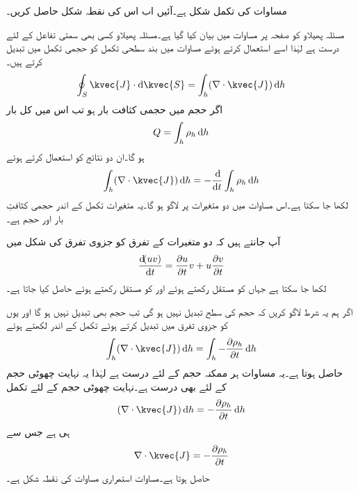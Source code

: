 مساوات   کی تکمل شکل ہے۔آئیں اب اس کی نقطہ شکل حاصل کریں۔

مسئلہ پھیلاو کو صفحہ  پر مساوات  میں بیان کیا گیا ہے۔مسئلہ پھیلاو کسی بھی سمتی تفاعل کے لئے درست ہے لہٰذا اسے استعمال کرتے ہوئے مساوات  میں بند سطحی تکمل کو حجمی تکمل میں تبدیل کرتے ہیں۔
\begin{align*}
\oint_S \kvec{J} \cdot \dif \kvec{S}=\int_h (\nabla \cdot \kvec{J}) \dif h
\end{align*}
اگر حجم میں حجمی کثافت بار  ہو تب اس میں کل بار
\begin{align*}
Q=\int_h \rho_h \dif h
\end{align*}
ہو گا۔ان دو نتائج کو استعمال کرتے ہوئے
\begin{align*}
\int_h (\nabla \cdot \kvec{J}) \dif h=-\frac{\dif}{\dif t} \int_h \rho_h \dif h
\end{align*}
لکھا جا سکتا ہے۔اس مساوات میں  دو متغیرات پر لاگو ہو گا۔یہ متغیرات تکمل کے اندر حجمی کثافتِ بار  اور حجم  ہے۔

آپ جانتے ہیں کہ دو متغیرات کے تفرق کو جزوی تفرق کی شکل میں
\begin{align*}
\frac{\dif (uv)}{\dif t}=\frac{\partial u}{\partial t} v+ u  \frac{\partial v}{\partial t}
\end{align*}
لکھا جا سکتا ہے جہاں  کو مستقل رکھتے ہوئے  اور  کو مستقل رکھتے ہوئے  حاصل کیا جاتا ہے۔

اگر ہم یہ شرط لاگو کریں کہ حجم کی سطح تبدیل نہیں ہو گی تب حجم بھی تبدیل نہیں ہو گا اور یوں  کو جزوی تفرق میں تبدیل کرتے ہوئے تکمل کے اندر لکھتے ہوئے
\begin{align*}
\int_h (\nabla \cdot \kvec{J}) \dif h=\int_h -\frac{\partial \rho_h}{\partial t} \dif h
\end{align*}
حاصل ہوتا ہے۔یہ مساوات ہر ممکنہ حجم کے لئے درست ہے لہٰذا یہ نہایت چھوٹی حجم کے لئے بھی درست ہے۔نہایت چھوٹی حجم  کے لئے تکمل
\begin{align*}
 (\nabla \cdot \kvec{J}) \dif h= -\frac{\partial \rho_h}{\partial t} \dif h
\end{align*}
ہی ہے جس سے
\begin{align}\label{مساوات_کپیسٹر_استمراری_مساوات_نقطہ_شکل}
\nabla \cdot \kvec{J}=-\frac{\partial \rho_h}{\partial t}
\end{align}
حاصل ہوتا ہے۔مساوات  استمراری مساوات کی نقطہ شکل ہے۔

